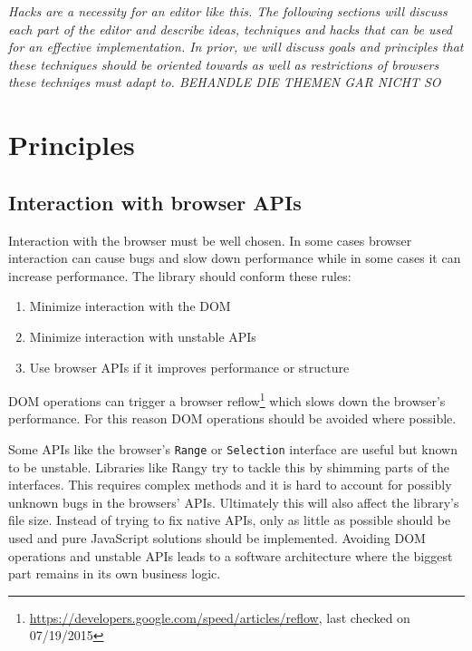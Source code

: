 \textit{Hacks are a necessity for an editor like this. The following sections will discuss each part of the editor and describe ideas, techniques and hacks that can be used for an effective implementation. In prior, we will discuss goals and principles that these techniques should be oriented towards as well as restrictions of browsers these techniqes must adapt to. BEHANDLE DIE THEMEN GAR NICHT SO} %




\chapter{Principles}
\label{ch:concept_principles}

\section{Interaction with browser APIs}
\label{sec:interaction_with_browser_apis}

Interaction with the browser must be well chosen. In some cases browser interaction can cause bugs and slow down performance while in some cases it can increase performance. The library should conform these rules:

\begin{enumerate} 
\item Minimize interaction with the DOM
\item Minimize interaction with unstable APIs
\item Use browser APIs if it improves performance or structure
\end{enumerate}

DOM operations can trigger a browser reflow\footnote{\url{https://developers.google.com/speed/articles/reflow}, last checked on 07/19/2015} which slows down the browser's performance. For this reason DOM operations should be avoided where possible.

Some APIs like the browser's \texttt{Range} or \texttt{Selection} interface are useful but known to be unstable. Libraries like Rangy try to tackle this by shimming parts of the interfaces. This requires complex methods and it is hard to account for possibly unknown bugs in the browsers' APIs. Ultimately this will also affect the library's file size. Instead of trying to fix native APIs, only as little as possible should be used and pure JavaScript solutions should be implemented. Avoiding DOM operations and unstable APIs leads to a software architecture where the biggest part remains in its own business logic. %

